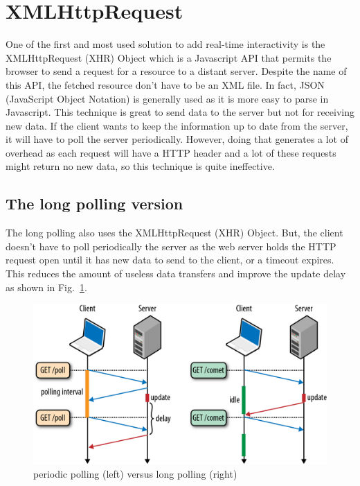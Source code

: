 \documentclass[journal,compsoc]{IEEEtran}
\begin{document}
\section{XMLHttpRequest}

One of the first and most used solution to add real-time interactivity is the XMLHttpRequest (XHR) Object which is a Javascript API that permits the browser to send a request for a resource to a distant server.
Despite the name of this API, the fetched resource don't have to be an XML file.
In fact, JSON (JavaScript Object Notation) is generally used as it is more easy to parse in Javascript.
This technique is great to send data to the server but not for receiving new data.
If the client wants to keep the information up to date from the server, it will have to poll the server periodically.
However, doing  that generates a lot of overhead as each request will have a HTTP header and a lot of these requests might return no new data, so this technique is quite ineffective.

\subsection{The long polling version}

The long polling also uses the XMLHttpRequest (XHR) Object.
But, the client doesn't have to poll periodically the server as the web server holds the HTTP request open until it has new data to send to the client, or a timeout expires.
This reduces the amount of useless data transfers and improve the update delay as shown in Fig.~\ref{poll_vs_lpoll}.

\begin{figure}
  \centering
  \label{poll_vs_lpoll}
  \includegraphics[width=\linewidth]{poll_vs_lpoll}
  \caption{periodic polling (left) versus long polling (right)}
\end{figure}
\end{document}
